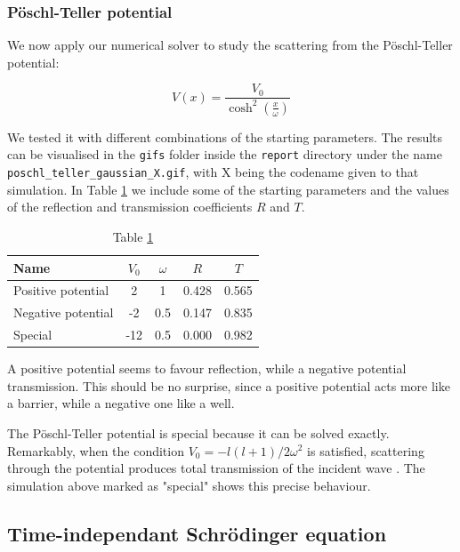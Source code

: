 \documentclass[a4paper,11]{article}
\newcommand{\mdcode}[1]{\lstinline[backgroundcolor=\color{gray!10}, frame=single, frameround=tttt]|#1|}
\begin{document}
\subsubsection{Pöschl-Teller potential}

We now apply our numerical solver to study the scattering from 
the Pöschl-Teller potential:

\[
	V(x) = \frac{V_{0}}{\cosh^2\left( \frac{x}{\omega}\right) }
\]

We tested it with different combinations of the starting parameters.
The results can be visualised in the 
\mdcode{gifs} folder inside the \mdcode{report} directory under the name
\mdcode{poschl_teller_gaussian_X.gif}, with X being the codename given to
that simulation. In Table \ref{table:poschl_teller}
we include some of the starting parameters and the values of the reflection 
and transmission coefficients $R$ and $T$.

\begin{table}[ht]
	\centering
	\begin{tabular}{l | c | c | c | c}
		Name & $V_{0}$ & $\omega$ & $R$ & $T$ \\
		\hline
		Positive potential & 2  & 1    & 0.428 & 0.565 \\
		Negative potential & -2 & 0.5  & 0.147 & 0.835 \\
		Special & -12 & 0.5 & 0.000 & 0.982 \\
	\end{tabular}
	\caption{Table \ref{table:poschl_teller}}
	\label{table:poschl_teller}
\end{table}

A positive potential seems to favour reflection, while a negative potential
transmission. This should be no surprise, since a positive potential acts
more like a barrier, while a negative one like a well.

The Pöschl-Teller potential is special because it can be solved exactly. 
Remarkably, when the condition $V_{0} = -l(l+1)/2\omega^{2}$ is satisfied,
scattering through the potential produces total transmission of the 
incident wave \parencite{wiki_poschl_teller}. The simulation above marked as 
"special" shows this precise behaviour.

\subsection{Time-independant Schrödinger equation}
\end{document}
